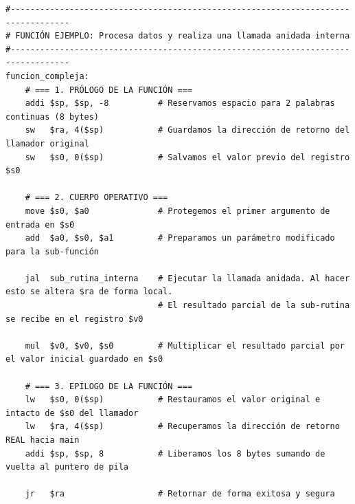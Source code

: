 \documentclass[11pt,letterpaper]{article}
\begin{document}
\begin{lstlisting}[caption={Plantilla estándar obligatoria para el prólogo y epílogo del manejo de la Pila.}]
#----------------------------------------------------------------------------------
# FUNCIÓN EJEMPLO: Procesa datos y realiza una llamada anidada interna
#----------------------------------------------------------------------------------
funcion_compleja:
    # === 1. PRÓLOGO DE LA FUNCIÓN ===
    addi $sp, $sp, -8          # Reservamos espacio para 2 palabras continuas (8 bytes)
    sw   $ra, 4($sp)           # Guardamos la dirección de retorno del llamador original
    sw   $s0, 0($sp)           # Salvamos el valor previo del registro $s0

    # === 2. CUERPO OPERATIVO ===
    move $s0, $a0              # Protegemos el primer argumento de entrada en $s0
    add  $a0, $s0, $a1         # Preparamos un parámetro modificado para la sub-función
    
    jal  sub_rutina_interna    # Ejecutar la llamada anidada. Al hacer esto se altera $ra de forma local.
                               # El resultado parcial de la sub-rutina se recibe en el registro $v0
                               
    mul  $v0, $v0, $s0         # Multiplicar el resultado parcial por el valor inicial guardado en $s0

    # === 3. EPÍLOGO DE LA FUNCIÓN ===
    lw   $s0, 0($sp)           # Restauramos el valor original e intacto de $s0 del llamador
    lw   $ra, 4($sp)           # Recuperamos la dirección de retorno REAL hacia main
    addi $sp, $sp, 8           # Liberamos los 8 bytes sumando de vuelta al puntero de pila
    
    jr   $ra                   # Retornar de forma exitosa y segura
\end{lstlisting}
\end{document}
